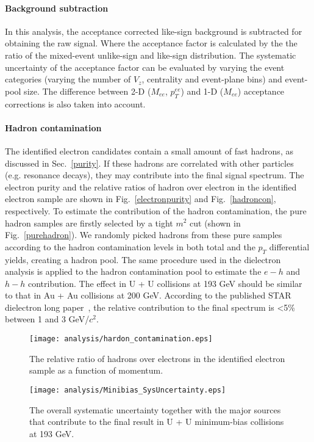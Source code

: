 \paragraph{Background subtraction} In this analysis, the acceptance corrected like-sign background is subtracted for obtaining the raw signal. Where the acceptance factor is calculated by the the ratio of the mixed-event unlike-sign and like-sign distribution. The systematic uncertainty of the acceptance factor can be evaluated by varying the event categories (varying the number of  $V_{z}$, centrality and event-plane bins) and event-pool size. The difference between 2-D ($M_{ee}$, $p_{T}^{ee}$) and 1-D ($M_{ee}$) acceptance corrections is also taken into account.

\paragraph{Hadron contamination} The identified electron candidates contain a small amount of fast hadrons, as discussed in Sec.~\ref{purity}. If these hadrons are correlated with other particles (e.g. resonance decays), they may contribute into the final signal spectrum. The electron purity and the relative ratios of hadron over electron in the identified electron sample are shown in Fig.~\ref{electronpurity} and Fig.~\ref{hadroncon}, respectively. To estimate the contribution of the hadron contamination, the pure hadron samples are firstly selected by a tight $m^{2}$ cut (shown in Fig.~\ref{purehadron}). We randomly picked hadrons from these pure samples according to the hadron contamination levels in both total and the $p_{T}$ differential yields, creating a hadron pool. The same procedure used in the dielectron analysis is applied to the hadron contamination pool to estimate the $e-h$ and $h-h$ contribution. The effect in U + U collisions at 193 GeV should be similar to that in Au + Au collisions at 200 GeV. According to the published STAR dielectron long paper~\cite{STAR:dielectron1}, the relative contribution to the final spectrum is <5\% between 1 and 3 GeV/$c^{2}$.

\begin{figure}[htbp]
\begin{minipage}[htbp]{0.49\linewidth}
\centering
\texttt{[image: analysis/hardon\_contamination.eps]}
\caption{The relative ratio of hadrons over electrons in the identified electron sample as a function of momentum.\label{hadroncon}}
\end{minipage}
\hfill
\begin{minipage}[htbp]{0.49\linewidth}
\centering
\texttt{[image: analysis/Minibias\_SysUncertainty.eps]} 
\caption{The overall systematic uncertainty together with the major sources that contribute to the final result in U + U minimum-bias collisions at 193 GeV.\label{sysuncertainty}}
\end{minipage}
\end{figure}

